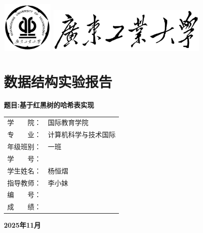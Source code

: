 \documentclass[12pt,a4paper]{article}
\begin{document}
\begin{center}
\includegraphics[width=1.02431in,height=1.01319in,alt={广东工业大学校徽}]{./media/image1.png}
\includegraphics[width=3.13333in,height=0.88333in,alt={广东工业大学校名}]{./media/image2.png}

\section*{\textbf{\fontsize{26pt}{30pt}\selectfont 数据结构实验报告}}
\label{sec:data_structure_lab_report}
\vspace{0.5cm}
\textbf{\fontsize{22pt}{26pt}\selectfont 题目:基于红黑树的哈希表实现}

\vspace{2cm}
\begin{tabular}{ll}
\fontsize{16pt}{19pt}\selectfont 学　　院： & \fontsize{16pt}{19pt}\selectfont 国际教育学院\\
\fontsize{16pt}{19pt}\selectfont 专　　业： & \fontsize{16pt}{19pt}\selectfont 计算机科学与技术国际\\
\fontsize{16pt}{19pt}\selectfont 年级班别： & \fontsize{16pt}{19pt}\selectfont 一班\\
\fontsize{16pt}{19pt}\selectfont 学　　号： & \fontsize{16pt}{19pt}\selectfont 3124009862\\
\fontsize{16pt}{19pt}\selectfont 学生姓名： & \fontsize{16pt}{19pt}\selectfont 杨恒熠\\
\fontsize{16pt}{19pt}\selectfont 指导教师： & \fontsize{16pt}{19pt}\selectfont 李小妹\\
\fontsize{16pt}{19pt}\selectfont 编　　号： & \fontsize{16pt}{19pt}\selectfont \dotfill\\
\fontsize{16pt}{19pt}\selectfont 成　　绩： & \fontsize{16pt}{19pt}\selectfont \dotfill\\
\end{tabular}
\vfill
\textbf{2025年11月}
\end{center}
\end{document}

